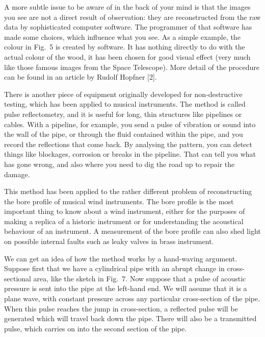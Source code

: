   A more subtle issue to be aware of in the back of your mind is that the 
  images you see are not a direct result of observation: they are reconstructed 
  from the raw data by sophisticated computer software. The programmer of that 
  software has made some choices, which influence what you see. As a simple 
  example, the colour in Fig.\ 5 is created by software. It has nothing 
  directly to do with the actual colour of the wood, it has been chosen for 
  good visual effect (very much like those famous images from the Space 
  Telescope). More detail of the procedure can be found in an article by Rudolf 
  Hopfner [2]. 

  There is another piece of equipment originally developed for non-destructive 
  testing, which has been applied to musical instruments. The method is called 
  pulse reflectometry, and it is useful for long, thin structures like 
  pipelines or cables. With a pipeline, for example, you send a pulse of 
  vibration or sound into the wall of the pipe, or through the fluid contained 
  within the pipe, and you record the reflections that come back. By analysing 
  the pattern, you can detect things like blockages, corrosion or breaks in the 
  pipeline. That can tell you what has gone wrong, and also where you need to 
  dig the road up to repair the damage. 

  This method has been applied to the rather different problem of 
  reconstructing the bore profile of musical wind instruments. The bore profile 
  is the most important thing to know about a wind instrument, either for the 
  purposes of making a replica of a historic instrument or for understanding 
  the acoustical behaviour of an instrument. A measurement of the bore profile 
  can also shed light on possible internal faults such as leaky valves in brass 
  instrument. 

  We can get an idea of how the method works by a hand-waving argument. Suppose 
  first that we have a cylindrical pipe with an abrupt change in 
  cross-sectional area, like the sketch in Fig.\ 7. Now suppose that a pulse of 
  acoustic pressure is sent into the pipe at the left-hand end. We will assume 
  that it is a plane wave, with constant pressure across any particular 
  cross-section of the pipe. When this pulse reaches the jump in cross-section, 
  a reflected pulse will be generated which will travel back down the pipe. 
  There will also be a transmitted pulse, which carries on into the second 
  section of the pipe. 


